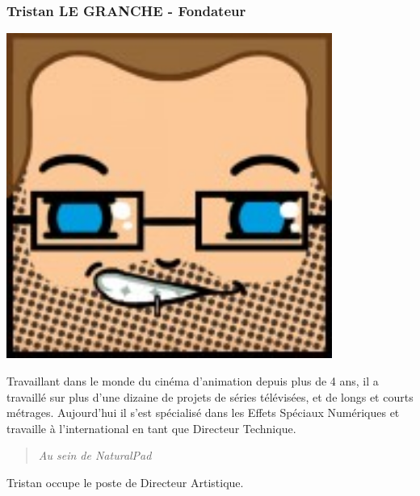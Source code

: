		\subsubsection*{Tristan LE GRANCHE - Fondateur}
\begin{minipage}[t!]{0.2\linewidth}
\centering
\includegraphics[width=0.8\textwidth]{images/tetocarre/tristan}
\end{minipage}
\begin{minipage}[t!]{0.79\linewidth}
Travaillant dans le monde du cinéma d’animation depuis plus de 4 ans, il a travaillé sur plus d’une dizaine de projets de séries télévisées, et de longs et courts métrages. Aujourd’hui il s’est spécialisé dans les Effets Spéciaux Numériques et travaille à l’international en tant que Directeur Technique.
		\begin{quotation} \emph{Au sein de NaturalPad} \end{quotation}
Tristan occupe le poste de Directeur Artistique.
\end{minipage}
	
